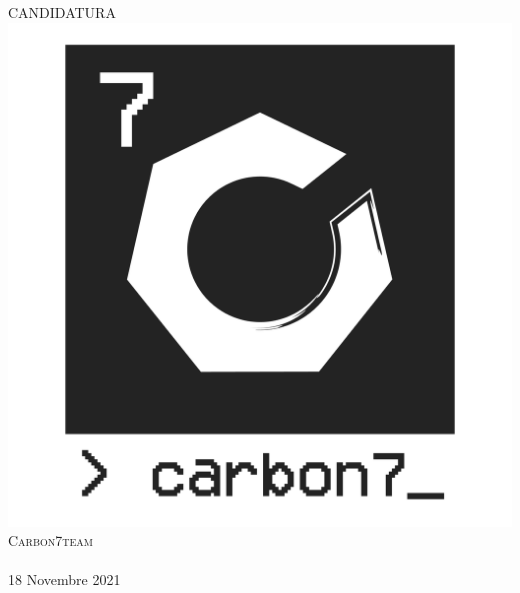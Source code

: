 \begin{center}
    \textsc{\huge CANDIDATURA}\\[0.75cm] 
    \includegraphics[scale=0.25]{res/images/carbon7_small_logo-07.png}\\[1cm]
    \textsc{\Large Carbon7team}\\[0.3cm]
    \\[0.5cm]
    {\large 18 Novembre 2021}\\[0.5cm]
    \\[0.5cm]


\end{center}
